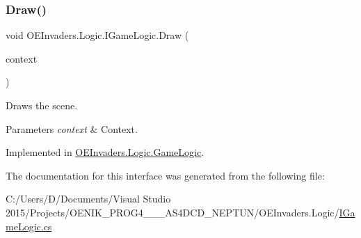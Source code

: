 \subsubsection{\texorpdfstring{Draw()}{Draw()}}
{\footnotesize\ttfamily void O\+E\+Invaders.\+Logic.\+I\+Game\+Logic.\+Draw (\begin{DoxyParamCaption}\item[{Drawing\+Context}]{context }\end{DoxyParamCaption})}



Draws the scene. 


\begin{DoxyParams}{Parameters}
{\em context} & Context.\\
\hline
\end{DoxyParams}


Implemented in \mbox{\hyperlink{class_o_e_invaders_1_1_logic_1_1_game_logic_a1c3170ab17c07442cefa33edc6e4f2f2}{O\+E\+Invaders.\+Logic.\+Game\+Logic}}.



The documentation for this interface was generated from the following file\+:\begin{DoxyCompactItemize}
\item 
C\+:/\+Users/\+D/\+Documents/\+Visual Studio 2015/\+Projects/\+O\+E\+N\+I\+K\+\_\+\+P\+R\+O\+G4\+\_\+\_\+\_\+\+A\+S4\+D\+C\+D\+\_\+\+N\+E\+P\+T\+U\+N/\+O\+E\+Invaders.\+Logic/\mbox{\hyperlink{_i_game_logic_8cs}{I\+Game\+Logic.\+cs}}\end{DoxyCompactItemize}
